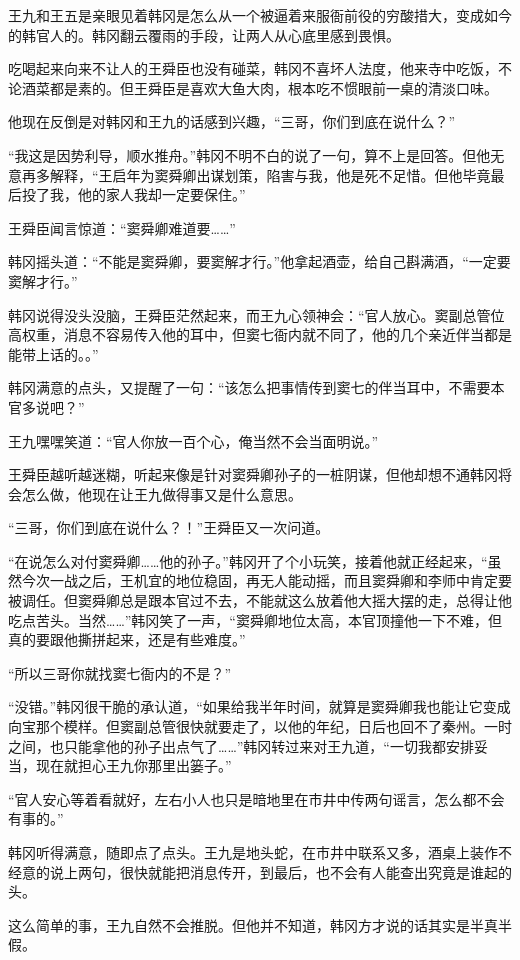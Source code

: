 王九和王五是亲眼见着韩冈是怎么从一个被逼着来服衙前役的穷酸措大，变成如今的韩官人的。韩冈翻云覆雨的手段，让两人从心底里感到畏惧。

吃喝起来向来不让人的王舜臣也没有碰菜，韩冈不喜坏人法度，他来寺中吃饭，不论酒菜都是素的。但王舜臣是喜欢大鱼大肉，根本吃不惯眼前一桌的清淡口味。

他现在反倒是对韩冈和王九的话感到兴趣，“三哥，你们到底在说什么？”

“我这是因势利导，顺水推舟。”韩冈不明不白的说了一句，算不上是回答。但他无意再多解释，“王启年为窦舜卿出谋划策，陷害与我，他是死不足惜。但他毕竟最后投了我，他的家人我却一定要保住。”

王舜臣闻言惊道：“窦舜卿难道要……”

韩冈摇头道：“不能是窦舜卿，要窦解才行。”他拿起酒壶，给自己斟满酒，“一定要窦解才行。”

韩冈说得没头没脑，王舜臣茫然起来，而王九心领神会：“官人放心。窦副总管位高权重，消息不容易传入他的耳中，但窦七衙内就不同了，他的几个亲近伴当都是能带上话的。。”

韩冈满意的点头，又提醒了一句：“该怎么把事情传到窦七的伴当耳中，不需要本官多说吧？”

王九嘿嘿笑道：“官人你放一百个心，俺当然不会当面明说。”

王舜臣越听越迷糊，听起来像是针对窦舜卿孙子的一桩阴谋，但他却想不通韩冈将会怎么做，他现在让王九做得事又是什么意思。

“三哥，你们到底在说什么？！”王舜臣又一次问道。

“在说怎么对付窦舜卿……他的孙子。”韩冈开了个小玩笑，接着他就正经起来，“虽然今次一战之后，王机宜的地位稳固，再无人能动摇，而且窦舜卿和李师中肯定要被调任。但窦舜卿总是跟本官过不去，不能就这么放着他大摇大摆的走，总得让他吃点苦头。当然……”韩冈笑了一声，“窦舜卿地位太高，本官顶撞他一下不难，但真的要跟他撕拼起来，还是有些难度。”

“所以三哥你就找窦七衙内的不是？”

“没错。”韩冈很干脆的承认道，“如果给我半年时间，就算是窦舜卿我也能让它变成向宝那个模样。但窦副总管很快就要走了，以他的年纪，日后也回不了秦州。一时之间，也只能拿他的孙子出点气了……”韩冈转过来对王九道，“一切我都安排妥当，现在就担心王九你那里出篓子。”

“官人安心等着看就好，左右小人也只是暗地里在市井中传两句谣言，怎么都不会有事的。”

韩冈听得满意，随即点了点头。王九是地头蛇，在市井中联系又多，酒桌上装作不经意的说上两句，很快就能把消息传开，到最后，也不会有人能查出究竟是谁起的头。

这么简单的事，王九自然不会推脱。但他并不知道，韩冈方才说的话其实是半真半假。

